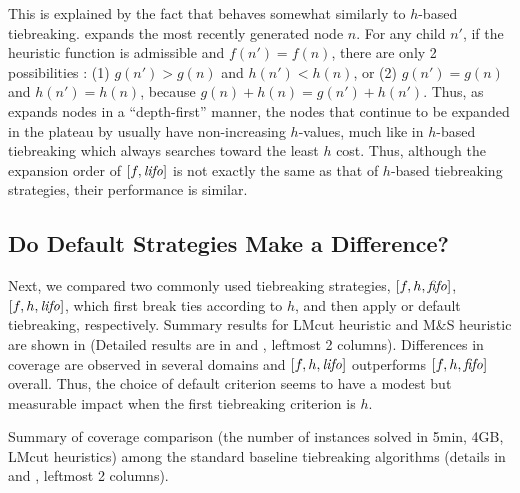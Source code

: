 This is explained by the fact that 
\lifo behaves somewhat similarly to $h$-based tiebreaking.
\lifo expands the most recently generated node $n$.
For any child $n'$, 
if the heuristic function is admissible and $f(n') = f(n)$, there are only 2 possibilities :
(1) $g(n') > g(n)$ and $h(n') < h(n)$, or
(2) $g(n') = g(n)$ and $h(n') = h(n)$,
because $g(n)+h(n)=g(n')+h(n')$.
Thus, as \lifo expands nodes in a ``depth-first'' manner,
the nodes that continue to be expanded in the plateau by \lifo usually   %
have non-increasing $h$-values,
much like in $h$-based tiebreaking which always searches toward the least $h$ cost.
Thus, although the expansion order of $[f,{\text{\textit{lifo}}}]$ is not exactly the same as that of $h$-based tiebreaking strategies,
their performance is similar.



\subsection{Do Default Strategies Make a Difference?}

Next, we  compared two commonly used tiebreaking strategies, $[f,h,{\text{\textit{fifo}}}]$, $[f,h,{\text{\textit{lifo}}}]$, which
first break ties according to $h$, and then apply \fifo or \lifo
default tiebreaking, respectively.
Summary results for LMcut heuristic \cite{Helmert2009} and M\&S heuristic \cite{HelmertHHN14} are
shown in  (Detailed results are in  and , leftmost 2 columns).
Differences in coverage are observed in several domains and $[f,h,{\text{\textit{lifo}}}]$ outperforms $[f,h,{\text{\textit{fifo}}}]$ overall. Thus, the choice of default criterion seems to have a modest but measurable impact when the first tiebreaking criterion is $h$.

\begin{table}[htbp]
 {
 \centering
 
 \caption{
 Summary of coverage comparison (the number of instances solved in 5min, 4GB, LMcut
 heuristics) among
 the standard baseline tiebreaking algorithms (details in  and , leftmost 2 columns). 
 }
 \label{tbl:summary-std}
 }
\end{table}


